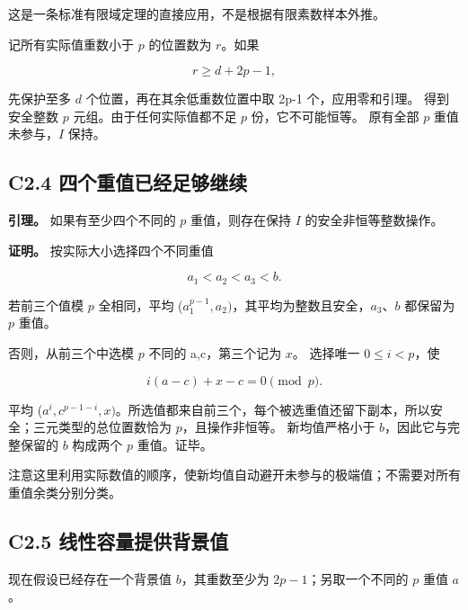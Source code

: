 \documentclass[11pt,a4paper]{article}
\theoremstyle{definition}
\numberwithin{equation}{section}
\begin{document}
{这是一条标准有限域定理的直接应用，不是根据有限素数样本外推。}

{记所有实际值重数小于} {\ensuremath{p}} {的位置数为} {\ensuremath{r}。如果}

\[
r\ge d+2p-1,
\tag{C2.4}
\]

{先保护至多} {\ensuremath{d}} {个位置，再在其余低重数位置中取} {2p-1} {个，应用零和引理。} {得到安全整数} {\ensuremath{p}} {元组。由于任何实际值都不足} {\ensuremath{p}} {份，它不可能恒等。} {原有全部} {\ensuremath{p}} {重值未参与，\ensuremath{I}} {保持。}

\subsection*{\texorpdfstring{{C2.4} {四个重值已经足够继续}}{C2.4 四个重值已经足够继续}}\label{C2-h7}

\textbf{{引理。}} {如果有至少四个不同的} {\ensuremath{p}} {重值，则存在保持} {\ensuremath{I}} {的安全非恒等整数操作。}

\textbf{{证明。}} {按实际大小选择四个不同重值}

\[
a_1<a_2<a_3<b.
\]

{若前三个值模} {\ensuremath{p}} {全相同，平均} {(\ensuremath{a_{1}^{p-1},a_{2})}，其平均为整数且安全，\ensuremath{a_{3}}、\ensuremath{b}} {都保留为} {\ensuremath{p}} {重值。}

{否则，从前三个中选模} {\ensuremath{p}} {不同的} {a,c，第三个记为} {\ensuremath{x}。} {选择唯一} {\ensuremath{0\le i<p}，使}

\[
i(a-c)+x-c=0\pmod p.
\]

{平均} {(\ensuremath{a^{i},c^{p-1-i},x)}。所选值都来自前三个，每个被选重值还留下副本，所以安全；三元类型的总位置数恰为} {\ensuremath{p}，且操作非恒等。} {新均值严格小于} {\ensuremath{b}，因此它与完整保留的} {\ensuremath{b}} {构成两个} {\ensuremath{p}} {重值。证毕。}

{注意这里利用实际数值的顺序，使新均值自动避开未参与的极端值；不需要对所有重值余类分别分类。}

\subsection*{\texorpdfstring{{C2.5} {线性容量提供背景值}}{C2.5 线性容量提供背景值}}\label{C2-h8}

{现在假设已经存在一个背景值} \(b\){，其重数至少为} \(2p-1\){；另取一个不同的} \(p\) {重值} \(a\){。}
\end{document}
